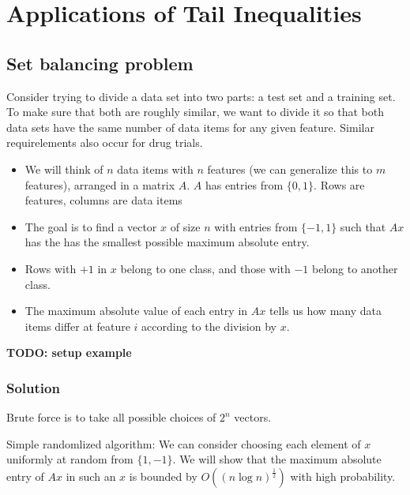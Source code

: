 \chapter{Applications of Tail Inequalities}


\section{Set balancing problem}

Consider trying to divide a data set into two parts: a test set and a training
set. To make sure that both are roughly similar, we want to divide it so that
both data sets have the same number of data items for any given feature.
Similar requirelements also occur for drug trials.

\begin{itemize}
\item We will think of $n$ data items with $n$ features (we can generalize this to
$m$ features), arranged in a matrix $A$. $A$ has entries from $\{0, 1\}$.
Rows are features, columns are data items

\item The goal is to find a vector $x$ of size $n$ with entries from $\{-1, 1\}$
such that $Ax$ has the has the smallest possible maximum absolute entry.

\item Rows with $+1$ in $x$ belong to one class, and those with $-1$ belong
to another class.

\item The maximum absolute value of each entry in $Ax$ tells us how many
data items differ at feature $i$ according to the division by $x$.
\end{itemize}

\textbf{TODO: setup example}

\subsection{Solution}
Brute force is to take all possible choices of $2^n$ vectors. 

Simple randomlized algorithm: We can consider choosing
each element of $x$ uniformly at random from $\{1, -1\}$. We will show that
the maximum absolute entry of $Ax$ in such an $x$ is bounded by
$O((n \log n)^\frac{1}{2})$ with high probability.

